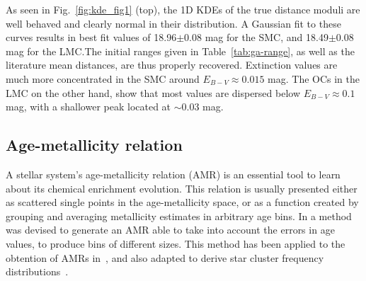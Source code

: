 \documentclass[a4paper,fleqn,usenatbib]{mnras}
\begin{document}
As seen in Fig.~\ref{fig:kde_fig1} (top), the 1D KDEs of the true distance
moduli are well behaved and clearly normal in their distribution.
A Gaussian fit to these curves results in best fit values of 18.96$\pm$0.08 mag
for the SMC, and 18.49$\pm$0.08 mag for the LMC.\@ The initial ranges given in
Table~\ref{tab:ga-range}, as well as the literature mean distances, are thus
properly recovered.
%
Extinction values are much more concentrated in the SMC around $E_{B-V}
{\approx}0.015$ mag. The OCs in the LMC on the other hand, show that most
values are dispersed below $E_{B-V}{\approx}0.1$ mag, with a shallower peak
located at ${\sim}0.03$ mag.








\subsection{Age-metallicity relation}
\label{ssec:amr}

A stellar system's age-metallicity relation (AMR) is an essential tool to learn
about its chemical enrichment evolution.
This relation is usually presented either as scattered single points in the
age-metallicity space, or as a function created by grouping and averaging
metallicity estimates in arbitrary age bins.
%
In \cite{Piatti_2010_AMR} a method was devised to generate an AMR able to take
into account the errors in age values, to produce bins of different sizes. This
method has been applied to the obtention of AMRs in~\cite{Piatti_Geisler_2013},
and also adapted to derive star cluster frequency distributions~\citep[e.g.,][]
{Piatti_2013_CF}.
\end{document}
